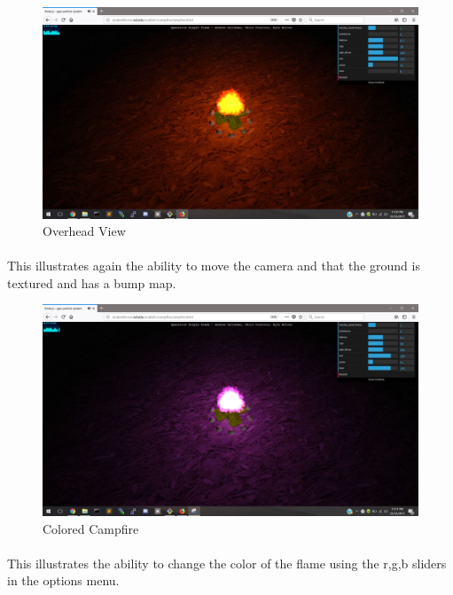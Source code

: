 \documentclass[letterpaper]{article}
\begin{document}
\begin{figure}[H]
\centering
\includegraphics[scale=.35]{result3.JPG}
\caption{Overhead View}
\label{fig:result3}
\end{figure}
\paragraph{}
This illustrates again the ability to move the camera and that the ground is textured and has a bump map.

\begin{figure}[H]
\centering
\includegraphics[scale=.35]{result4.JPG}
\caption{Colored Campfire}
\label{fig:result4}
\end{figure}
\paragraph{}
This illustrates the ability to change the color of the flame using the r,g,b sliders in the options menu.
\end{document}
